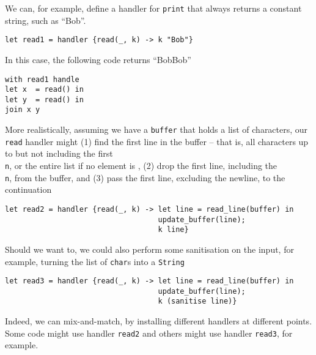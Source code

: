 We can, for example, define a handler for \texttt{print} that always returns a constant string, such as ``Bob''.
\begin{verbatim}
let read1 = handler {read(_, k) -> k "Bob"}
\end{verbatim}
In this case, the following code returns ``BobBob''
\begin{verbatim}
with read1 handle 
let x  = read() in 
let y  = read() in
join x y
\end{verbatim}
More realistically, assuming we have a \texttt{buffer} that holds a list of characters, our \texttt{read} handler might (1) find the first line in the buffer -- that is, all characters up to but not including the first \texttt{\\n}, or the entire list if no element is \texttt{\n}, (2) drop the first line, including the \texttt{\\n}, from the buffer, and (3) pass the first line, excluding the newline, to the continuation
\begin{verbatim}
let read2 = handler {read(_, k) -> let line = read_line(buffer) in 
                                   update_buffer(line);
                                   k line}
\end{verbatim}
Should we want to, we could also perform some sanitisation on the input, for example, turning the list of \texttt{char}s into a \texttt{String}
\begin{verbatim}
let read3 = handler {read(_, k) -> let line = read_line(buffer) in 
                                   update_buffer(line);
                                   k (sanitise line)}
\end{verbatim}
Indeed, we can mix-and-match, by installing different handlers at different points. Some code might use handler \texttt{read2} and others might use handler \texttt{read3}, for example.

